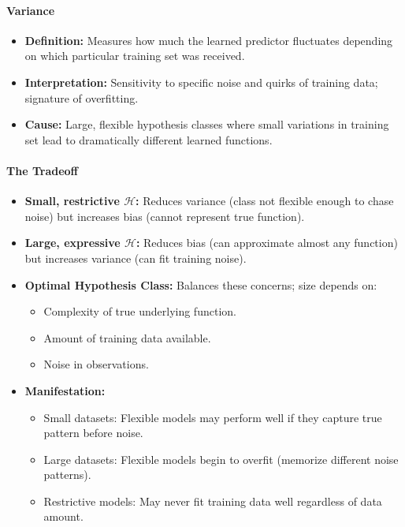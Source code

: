 \paragraph{Variance}
\begin{itemize}
    \item \textbf{Definition:} Measures how much the learned predictor fluctuates depending on which particular training set was received.
    \item \textbf{Interpretation:} Sensitivity to specific noise and quirks of training data; signature of overfitting.
    \item \textbf{Cause:} Large, flexible hypothesis classes where small variations in training set lead to dramatically different learned functions.
\end{itemize}

\paragraph{The Tradeoff}
\begin{itemize}
    \item \textbf{Small, restrictive $\mathcal{H}$:} Reduces variance (class not flexible enough to chase noise) but increases bias (cannot represent true function).
    \item \textbf{Large, expressive $\mathcal{H}$:} Reduces bias (can approximate almost any function) but increases variance (can fit training noise).
    \item \textbf{Optimal Hypothesis Class:} Balances these concerns; size depends on:
    \begin{itemize}
        \item Complexity of true underlying function.
        \item Amount of training data available.
        \item Noise in observations.
    \end{itemize}
    \item \textbf{Manifestation:}
    \begin{itemize}
        \item Small datasets: Flexible models may perform well if they capture true pattern before noise.
        \item Large datasets: Flexible models begin to overfit (memorize different noise patterns).
        \item Restrictive models: May never fit training data well regardless of data amount.
    \end{itemize}
\end{itemize}

